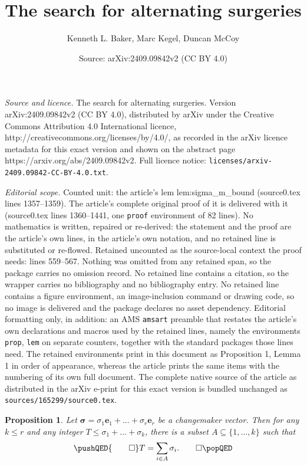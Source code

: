 \documentclass[10pt,a4paper]{amsart}
\title{The search for alternating surgeries}
\author{Kenneth L. Baker, Marc Kegel, Duncan McCoy}
\date{Source: arXiv:2409.09842v2 (CC BY 4.0)}
\newtheorem{prop}{Proposition}
\newcommand{\bsigma}{\bm{\sigma}}
\newcommand{\e}{\bm{e}}
\begin{document}
\maketitle

\noindent\emph{Source and licence.} The search for alternating surgeries. Version arXiv:2409.09842v2 (CC BY 4.0), distributed by arXiv under the Creative Commons Attribution 4.0 International licence, http://creativecommons.org/licenses/by/4.0/, as recorded in the arXiv licence metadata for this exact version and shown on the abstract page https://arxiv.org/abs/2409.09842v2. Full licence notice: \texttt{licenses/arxiv-2409.09842-CC-BY-4.0.txt}.\par\smallskip

\noindent\textit{Editorial scope.} Counted unit: the article's lem lem:sigma\_m\_bound (source0.tex lines 1357--1359). The article's complete original proof of it is delivered with it (source0.tex lines 1360--1441, one \texttt{proof} environment of 82 lines). No mathematics is written, repaired or re-derived: the statement and the proof are the article's own lines, in the article's own notation, and no retained line is substituted or re-flowed.  Retained uncounted as the source-local context the proof needs: lines 559--567.  Nothing was omitted from any retained span, so the package carries no omission record.  No retained line contains a citation, so the wrapper carries no bibliography and no bibliography entry.  No retained line contains a figure environment, an image-inclusion command or drawing code, so no image is delivered and the package declares no asset dependency.  Editorial formatting only, in addition: an AMS \texttt{amsart} preamble that restates the article's own declarations and macros used by the retained lines, namely the environments \texttt{prop}, \texttt{lem} on separate counters, together with the standard packages those lines need.  The retained environments print in this document as Proposition 1, Lemma 1 in order of appearance, whereas the article prints the same items with the numbering of its own full document.  The complete native source of the article as distributed in the arXiv e-print for this exact version is bundled unchanged as \texttt{sources/165299/source0.tex}.
\begin{prop}\label{prop:CM_condition}
Let $\bsigma = \sigma_1 \e_1 + \dots + \sigma_r \e_r$ be a changemaker vector.
Then for any $k\leq r$ and any integer $T\leq \sigma_1 + \dots + \sigma_k$, there is a subset $A\subseteq \{1,\dots, k\}$ such that 
\[
\pushQED{\qed} 
T=\sum_{i\in A}\sigma_i.\qedhere
\popQED
\]
\end{prop}
\end{document}
